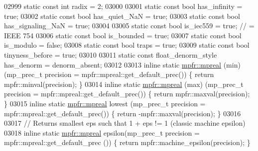 \begin{DoxyCode}
{{{02999         \textcolor{keyword}{static} \textcolor{keyword}{const} \textcolor{keywordtype}{int}  radix             = 2;
03000 
03001         \textcolor{keyword}{static} \textcolor{keyword}{const} \textcolor{keywordtype}{bool} has\_infinity      = \textcolor{keyword}{true};
03002         \textcolor{keyword}{static} \textcolor{keyword}{const} \textcolor{keywordtype}{bool} has\_quiet\_NaN     = \textcolor{keyword}{true};
03003         \textcolor{keyword}{static} \textcolor{keyword}{const} \textcolor{keywordtype}{bool} has\_signaling\_NaN = \textcolor{keyword}{true};
03004 
03005         \textcolor{keyword}{static} \textcolor{keyword}{const} \textcolor{keywordtype}{bool} is\_iec559         = \textcolor{keyword}{true};        \textcolor{comment}{// = IEEE 754}
03006         \textcolor{keyword}{static} \textcolor{keyword}{const} \textcolor{keywordtype}{bool} is\_bounded        = \textcolor{keyword}{true};
03007         \textcolor{keyword}{static} \textcolor{keyword}{const} \textcolor{keywordtype}{bool} is\_modulo         = \textcolor{keyword}{false};
03008         \textcolor{keyword}{static} \textcolor{keyword}{const} \textcolor{keywordtype}{bool} traps             = \textcolor{keyword}{true};
03009         \textcolor{keyword}{static} \textcolor{keyword}{const} \textcolor{keywordtype}{bool} tinyness\_before   = \textcolor{keyword}{true};
03010 
03011         \textcolor{keyword}{static} \textcolor{keyword}{const} float\_denorm\_style has\_denorm  = denorm\_absent;
03012 
03013         \textcolor{keyword}{inline} \textcolor{keyword}{static} \hyperlink{classmpfr_1_1mpreal}{mpfr::mpreal} (min)    (mp\_prec\_t precision = 
      mpfr::mpreal::get\_default\_prec()) \{  \textcolor{keywordflow}{return}  mpfr::minval(precision);  \}
03014         \textcolor{keyword}{inline} \textcolor{keyword}{static} \hyperlink{classmpfr_1_1mpreal}{mpfr::mpreal} (max)    (mp\_prec\_t precision = 
      mpfr::mpreal::get\_default\_prec()) \{  \textcolor{keywordflow}{return}  mpfr::maxval(precision);  \}
03015         \textcolor{keyword}{inline} \textcolor{keyword}{static} \hyperlink{classmpfr_1_1mpreal}{mpfr::mpreal} lowest   (mp\_prec\_t precision = 
      mpfr::mpreal::get\_default\_prec()) \{  \textcolor{keywordflow}{return} -mpfr::maxval(precision);  \}
03016 
03017         \textcolor{comment}{// Returns smallest eps such that 1 + eps != 1 (classic machine epsilon)}
03018         \textcolor{keyword}{inline} \textcolor{keyword}{static} \hyperlink{classmpfr_1_1mpreal}{mpfr::mpreal} epsilon(mp\_prec\_t precision = mpfr::mpreal::get\_default\_prec
      ()) \{  \textcolor{keywordflow}{return}  mpfr::machine\_epsilon(precision); \}
}}}
\end{DoxyCode}
